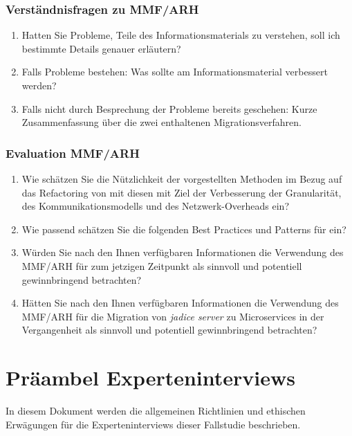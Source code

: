 \subsection{Verständnisfragen zu MMF/ARH}

\begin{enumerate}
	\item Hatten Sie Probleme, Teile des Informationsmaterials zu verstehen, soll ich bestimmte Details genauer erläutern?
	\item Falls Probleme bestehen: Was sollte am Informationsmaterial verbessert werden?
	\item Falls nicht durch Besprechung der Probleme bereits geschehen: Kurze Zusammenfassung über die zwei enthaltenen Migrationsverfahren.
\end{enumerate}

\subsection{Evaluation MMF/ARH}

\begin{enumerate}
	\item Wie schätzen Sie die Nützlichkeit der vorgestellten Methoden im Bezug auf das Refactoring von \jf mit diesen mit Ziel der Verbesserung der Granularität, des Kommunikationsmodells und des Netzwerk-Overheads ein?
	\item Wie passend schätzen Sie die folgenden Best Practices und Patterns für \jf ein?
	\item Würden Sie nach den Ihnen verfügbaren Informationen die Verwendung des MMF/ARH für \jf zum jetzigen Zeitpunkt als sinnvoll und potentiell gewinnbringend betrachten?
	\item Hätten Sie nach den Ihnen verfügbaren Informationen die Verwendung des MMF/ARH für die Migration von \emph{jadice server} zu Microservices in der Vergangenheit  als sinnvoll und potentiell gewinnbringend betrachten?
\end{enumerate}





\chapter{Präambel Experteninterviews}
\label{chap:expert-interviews-preamble}

In diesem Dokument werden die allgemeinen Richtlinien und ethischen Erwägungen für die Experteninterviews dieser Fallstudie beschrieben.

